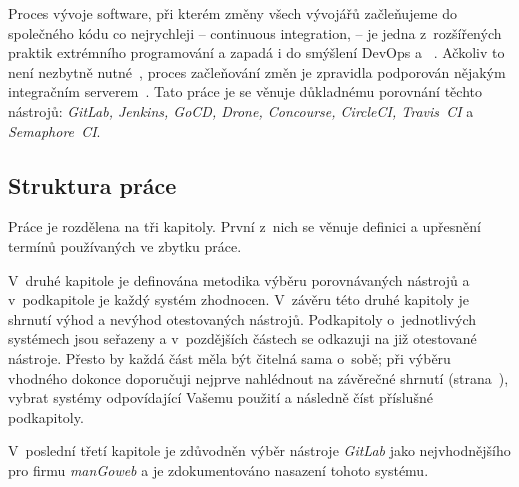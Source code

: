 \label{Úvod}
Proces vývoje software, při kterém změny všech vývojářů začleňujeme do společného kódu co nejrychleji -- continuous integration,  -- je jedna z~rozšířených praktik extrémního programování a zapadá i do smýšlení DevOps a ~\cite{beyer2016site}. Ačkoliv to není nezbytně nutné~\cite{shore-ci}, proces začleňování změn je zpravidla podporován nějakým integračním serverem~\cite{fowler-ci}. Tato práce je se věnuje důkladnému porovnání těchto \CICD nástrojů: \textit{GitLab, Jenkins, GoCD, Drone, Concourse, CircleCI, Travis~CI} a \textit{Semaphore~CI}.

\subsection{Struktura práce}
    Práce je rozdělena na tři kapitoly. První z~nich se věnuje definici a upřesnění termínů používaných ve zbytku práce.

    V~druhé kapitole je definována metodika výběru porovnávaných \CICD nástrojů a v~podkapitole je každý systém zhodnocen. V~závěru této druhé kapitoly je shrnutí výhod a nevýhod otestovaných nástrojů. Podkapitoly o~jednotlivých systémech jsou seřazeny a v~pozdějších částech se odkazuji na již otestované nástroje. Přesto by každá část měla být čitelná sama o~sobě; při výběru vhodného \CICD dokonce doporučuji nejprve nahlédnout na závěrečné shrnutí (strana~\pageref{overview}), vybrat systémy odpovídající Vašemu použití a následně číst příslušné podkapitoly.

    V~poslední třetí kapitole je zdůvodněn výběr nástroje \textit{GitLab} jako nejvhodnějšího pro firmu \textit{manGoweb} a je zdokumentováno nasazení tohoto systému.
